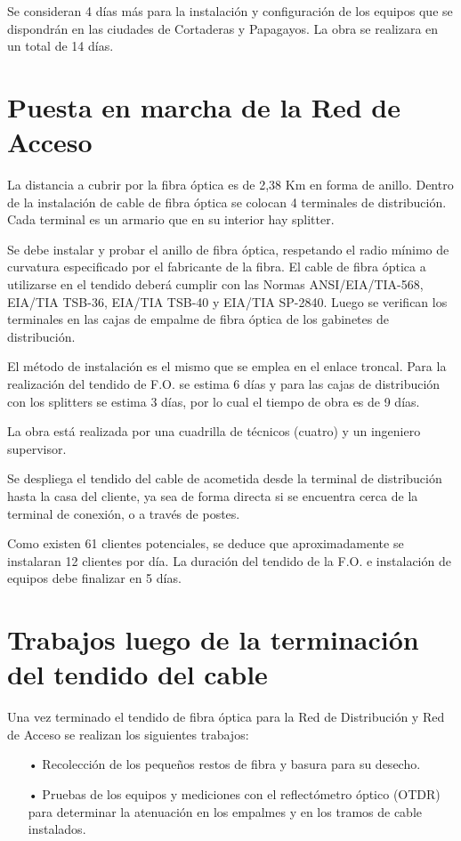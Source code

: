 Se consideran 4 días más para la instalación y configuración de los equipos que se dispondrán en las ciudades de Cortaderas y Papagayos. La obra se realizara en un total de 14 días.

\section{Puesta en marcha de la Red de Acceso}
La distancia a cubrir por la fibra óptica es de 2,38 Km en forma de anillo. Dentro de la instalación de cable de fibra óptica se colocan 4 terminales de distribución. Cada terminal es un armario que en su interior hay splitter.

Se debe instalar y probar el anillo de fibra óptica, respetando el radio mínimo de curvatura especificado por el fabricante de la fibra. El cable de fibra óptica a utilizarse en el tendido deberá cumplir con las Normas  ANSI/EIA/TIA-568, EIA/TIA TSB-36, EIA/TIA TSB-40 y EIA/TIA SP-2840. Luego se verifican los terminales en las cajas de empalme de fibra óptica de los gabinetes de distribución.

El método de instalación es el mismo que se emplea en el enlace troncal. Para la realización del tendido de F.O. se estima 6 días y para las cajas de distribución con los splitters se estima 3 días, por lo cual el tiempo de obra es de 9 días.

La obra está realizada por una cuadrilla de técnicos (cuatro) y un ingeniero supervisor.

Se despliega el tendido del cable de acometida desde la terminal de distribución hasta la casa del cliente, ya sea de forma directa si se encuentra cerca de la terminal de conexión, o a través de postes.

Como existen 61 clientes potenciales, se deduce que aproximadamente se instalaran 12 clientes por día. La duración del tendido de la F.O. e instalación de equipos debe finalizar en 5 días.
\section{Trabajos luego de la terminación del tendido del cable}

Una vez terminado el tendido de fibra óptica para la Red de Distribución y Red de Acceso se realizan los siguientes trabajos:

\begin{itemize}

\item[•]Recolección de los pequeños restos de fibra y basura para su desecho.

\item[•]Pruebas de los equipos y mediciones con el reflectómetro óptico (OTDR) para determinar la atenuación en los empalmes y en los tramos de cable instalados.
\end{itemize}

